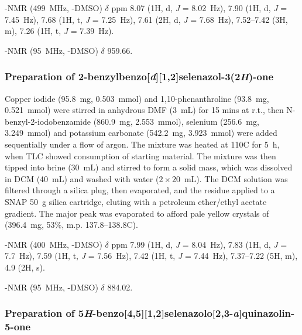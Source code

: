 \begin{refsection}
    -NMR (499~MHz, -DMSO) $ \delta $ ppm 8.07 (1H, d, \textit{J} = 8.02~Hz), 7.90 (1H, d, \textit{J} = 7.45~Hz), 7.68 (1H, t, \textit{J} = 7.25~Hz), 7.61 (2H, d, \textit{J} = 7.68~Hz), 7.52--7.42 (3H, m), 7.26 (1H, t, \textit{J} = 7.39~Hz).
    
    -NMR (95~MHz, -DMSO) $ \delta $ 959.66.
    
    \subsubsection[Preparation of \refcmpd{ebs.bn}]{Preparation of 2-benzylbenzo[\textit{d}][1,2]selenazol-3(2\textit{H})-one }
    
    Copper iodide (95.8~mg, 0.503~mmol) and 1,10-phenanthroline (93.8~mg, 0.521~mmol) were stirred in anhydrous DMF (3~mL) for 15 mins at r.t., then N-benzyl-2-iodobenz\-amide (860.9~mg, 2.553~mmol), selenium (256.6~mg, 3.249~mmol) and potassium carbonate (542.2~mg, 3.923~mmol) were added sequentially under a flow of argon.
    The mixture was heated at 110\degree{}C for 5~h, when TLC showed consumption of starting material.
    The mixture was then tipped into brine (30~mL) and stirred to form a solid mass, which was dissolved in DCM (40~mL) and washed with water ($ 2 \times 20 $~mL).
    The DCM solution was filtered through a silica plug, then evaporated, and the residue applied to a SNAP 50~g silica cartridge, eluting with a petroleum ether/ethyl acetate gradient.
    The major peak was evaporated to afford pale yellow crystals of  (396.4~mg, 53\%, m.p. 137.8--138.8\degree{}C).\autocite{Bhabak2010}
    
    -NMR (400~MHz, -DMSO) $\delta$ ppm 7.99 (1H, d, \textit{J} = 8.04~Hz), 7.83 (1H, d, \textit{J} = 7.7~Hz), 7.59 (1H, t, \textit{J} = 7.56~Hz), 7.42 (1H, t, \textit{J} = 7.44~Hz), 7.37--7.22 (5H, m), 4.9 (2H, s).
    
    -NMR (95~MHz, -DMSO) $ \delta $ 884.02.
    
    \subsubsection[Preparation of \refcmpd{tetracycle}]{Preparation of 5\textit{H}-benzo[4,5][1,2]selenazolo[2,3-\textit{a}]quinazolin-5-one }
    

\end{refsection}

